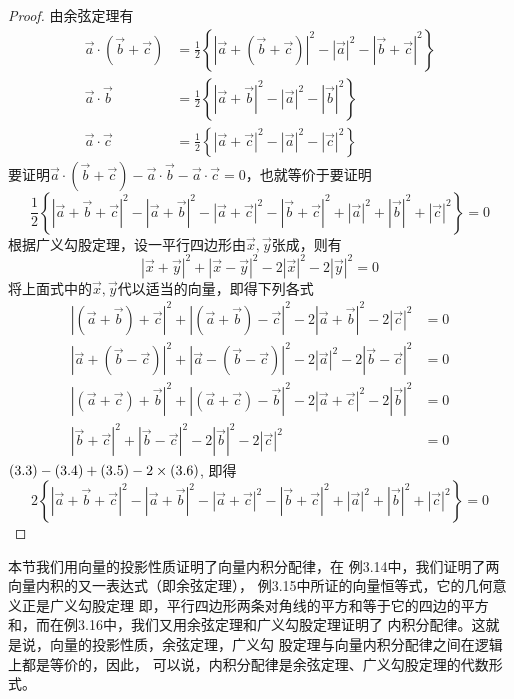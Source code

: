 \begin{proof}
    由余弦定理有
\[\begin{split}
    \vec{a}\cdot \left(\vec{b}+\vec{c}\right)&=\frac{1}{2}\left\{\left|\vec{a}+\left(\vec{b}+\vec{c}\right)\right|^2-\left|\vec{a}\right|^2-\left|\vec{b}+\vec{c}\right|^2\right\}  \\
    \vec{a}\cdot \vec{b}&=\frac{1}{2}\left\{\left|\vec{a}+\vec{b}\right|^2-\left|\vec{a}\right|^2-\left|\vec{b}\right|^2\right\}  \\
    \vec{a}\cdot \vec{c}&= \frac{1}{2}\left\{\left|\vec{a}+\vec{c}\right|^2-\left|\vec{a}\right|^2-\left|\vec{c}\right|^2\right\} 
\end{split}\]
要证明$\vec{a}\cdot \left(\vec{b}+\vec{c}\right)-\vec{a}\cdot \vec{b}-\vec{a}\cdot \vec{c}=0$，也就等价于要证明
\[\frac{1}{2}\left\{\left|\vec{a}+\vec{b}+\vec{c}\right|^2-\left|\vec{a}+\vec{b}\right|^2-\left|\vec{a}+\vec{c}\right|^2-\left|\vec{b}+\vec{c}\right|^2+\left|\vec{a}\right|^2+\left|\vec{b}\right|^2+\left|\vec{c}\right|^2\right\}=0\]
根据广义勾股定理，设一平行四边形由$\vec{x},\vec{y}$张成，则有
\[\left|\vec{x}+\vec{y}\right|^2+\left|\vec{x}-\vec{y}\right|^2-2|\vec{x}|^2-2|\vec{y}|^2=0\]
将上面式中的$\vec{x},\vec{y}$代以适当的向量，即得下列各式
\begin{align}
\left|\left(\vec{a}+\vec{b}\right)+\vec{c}\right|^2+\left|\left(\vec{a}+\vec{b}\right)-\vec{c}\right|^2-2\left|\vec{a}+\vec{b}\right|^2-2\left|\vec{c}\right|^2&=0\\
\left|\vec{a}+\left(\vec{b}-\vec{c}\right)\right|^2+\left|\vec{a}-\left(\vec{b}-\vec{c}\right)\right|^2-2\left|\vec{a}\right|^2-2\left|\vec{b}-\vec{c}\right|^2&=0\\
\left|\left(\vec{a}+\vec{c}\right)+\vec{b}\right|^2+\left|\left(\vec{a}+\vec{c}\right)-\vec{b}\right|^2-2\left|\vec{a}+\vec{c}\right|^2-2\left|\vec{b}\right|^2&=0\\
\left|\vec{b}+\vec{c}\right|^2+\left|\vec{b}-\vec{c}\right|^2-2\left|\vec{b}\right|^2-2\left|\vec{c}\right|^2&=0
\end{align}
$(3.3)-(3.4)+(3.5)-2\times(3.6)$, 即得
\[2\left\{\left|\vec{a}+\vec{b}+\vec{c}\right|^2-\left|\vec{a}+\vec{b}\right|^2-\left|\vec{a}+\vec{c}\right|^2-\left|\vec{b}+\vec{c}\right|^2+\left|\vec{a}\right|^2+\left|\vec{b}\right|^2+\left|\vec{c}\right|^2\right\}=0\]
\end{proof}

本节我们用向量的投影性质证明了向量内积分配律，在
例3.14中，我们证明了两向量内积的又一表达式（即余弦定理），
例3.15中所证的向量恒等式，它的几何意义正是广义勾股定理
即，平行四边形两条对角线的平方和等于它的四边的平方
和，而在例3.16中，我们又用余弦定理和广义勾股定理证明了
内积分配律。这就是说，向量的投影性质，余弦定理，广义勾
股定理与向量内积分配律之间在逻辑上都是等价的，因此，
可以说，内积分配律是余弦定理、广义勾股定理的代数形
式。


